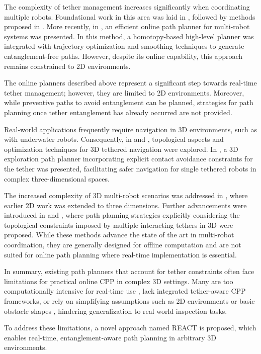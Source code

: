The complexity of tether management increases significantly when coordinating multiple robots. Foundational work in this area was laid in \cite{hert1996ties}, followed by methods proposed in \cite{zhang2019planning}. More recently, in \cite{cao2023neptune}, an efficient online path planner for multi-robot systems was presented. In this method, a homotopy-based high-level planner was integrated with trajectory optimization and smoothing techniques to generate entanglement-free paths. However, despite its online capability, this approach remains constrained to 2D environments.

The online planners described above represent a significant step towards real-time tether management; however, they are limited to 2D environments. Moreover, while preventive paths to avoid entanglement can be planned, strategies for path planning once tether entanglement has already occurred are not provided.

Real-world applications frequently require navigation in 3D environments, such as with underwater robots. Consequently, in \cite{bhattacharya2012topological} and \cite{martinez2021optimization}, topological aspects and optimization techniques for 3D tethered navigation were explored. In \cite{petit2022tape}, a 3D exploration path planner incorporating explicit contact avoidance constraints for the tether was presented, facilitating safer navigation for single tethered robots in complex three-dimensional spaces.

The increased complexity of 3D multi-robot scenarios was addressed in \cite{hert1999motion}, where earlier 2D work was extended to three dimensions. Further advancements were introduced in \cite{patil2023coordinating} and \cite{cao2023path}, where path planning strategies explicitly considering the topological constraints imposed by multiple interacting tethers in 3D were proposed. While these methods advance the state of the art in multi-robot coordination, they are generally designed for offline computation and are not suited for online path planning where real-time implementation is essential.

In summary, existing path planners that account for tether constraints often face limitations for practical online \ac{CPP} in complex 3D settings. Many are too computationally intensive for real-time use \cite{mechsy2017novel, hert1999motion, patil2023coordinating, cao2023path}, lack integrated tether-aware CPP frameworks, or rely on simplifying assumptions such as 2D environments or basic obstacle shapes \cite{kim, withy, cao2023neptune}, hindering generalization to real-world inspection tasks.

To address these limitations, a novel approach named \ac{REACT} is proposed, which enables real-time, entanglement-aware path planning in arbitrary 3D environments.